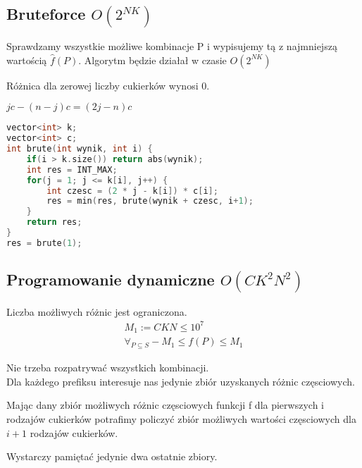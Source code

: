 \documentclass[paper=a4, fontsize=11pt]{article}
\begin{document}
\subsection{Bruteforce $O(2^{NK})$}
Sprawdzamy wszystkie możliwe kombinacje P i wypisujemy tą z najmniejszą wartością $\hat{f}(P)$. Algorytm będzie działał w czasie $O(2^{NK})$
\begin{observation} Różnica dla zerowej liczby cukierków wynosi 0.
\begin{observation} $jc - (n - j)c  = (2j - n)c$

\end{observation}

\begin{lstlisting}[language=c++]
vector<int> k;
vector<int> c;
int brute(int wynik, int i) {
	if(i > k.size()) return abs(wynik);
	int res = INT_MAX;	
	for(j = 1; j <= k[i], j++) {
		int czesc = (2 * j - k[i]) * c[i];
		res = min(res, brute(wynik + czesc, i+1);
	}
	return res;
}
res = brute(1);

\end{lstlisting}

\subsection{Programowanie dynamiczne $O(CK^2N^2)$}
\begin{observation} Liczba możliwych różnic jest ograniczona.
\begin{gather*}
	M_1 := CKN \leq 10^7 \\
	\forall_{P\subseteq S} -M_1 \leq f(P) \leq M_1
\end{gather*}
\end{observation}
\begin{observation} Nie trzeba rozpatrywać wszystkich kombinacji. \\
Dla każdego prefiksu interesuje nas jedynie zbiór uzyskanych różnic częsciowych.
\end{observation}

\end{observation}
\begin{observation} Mając dany zbiór możliwych różnic częsciowych funkcji f dla pierwszych i rodzajów cukierków potrafimy policzyć zbiór możliwych wartości częsciowych dla $i+1$ rodzajów cukierków.
\end{observation}
\begin{observation} Wystarczy pamiętać jedynie dwa ostatnie zbiory.
\end{observation}
\end{document}
